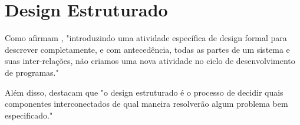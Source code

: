 \documentclass[12pt,a4paper]{article}
\begin{document}
\section{Design Estruturado}

Como afirmam \textcite{yourdon1979structured}, 
"introduzindo uma atividade específica de design formal para descrever completamente, e com antecedência, todas as partes de um sistema e suas inter-relações, não criamos uma nova atividade no ciclo de desenvolvimento de programas." 

Além disso, \textcite{yourdon1979structured} destacam que 
"o design estruturado é o processo de decidir quais componentes interconectados de qual maneira resolverão algum problema bem especificado."

\printbibliography
\end{document}
